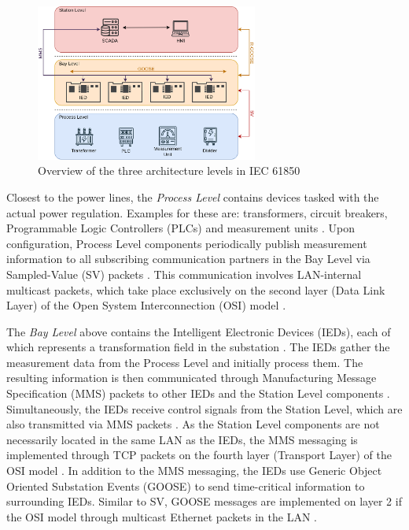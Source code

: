 \documentclass[conference, onecolumn, a4paper]{IEEEtran}
\begin{document}
\begin{figure}[h]
    \centering
    \includegraphics[width=0.65\textwidth]{images/IEC61850_Architecture.png}
    \caption{Overview of the three architecture levels in IEC 61850 \cite{SGRWin_IEC61850Architecture:2021}}
    \label{image:IEC61850Architecture}
\end{figure}

\noindent Closest to the power lines, the \textit{Process Level} contains devices tasked with the actual power regulation. Examples for these are: 
transformers, circuit breakers, Programmable Logic Controllers (PLCs) and measurement units \cite{SGRWin_IEC61850Architecture:2021}. Upon configuration, 
Process Level components periodically publish measurement information to all subscribing communication partners in the Bay Level via Sampled-Value (SV) 
packets \cite{TyphoonHIL_IEC61850SV:2021}. This communication involves LAN-internal multicast packets, which take place exclusively on the second layer 
(Data Link Layer) of the Open System Interconnection (OSI) model \cite{TyphoonHIL_IEC61850SV:2021}. 

\smallskip
The \textit{Bay Level} above contains the Intelligent Electronic Devices (IEDs), each of which represents a transformation field in the substation 
\cite[p. 29]{IEC61850-7-1:2011}. The IEDs gather the measurement data from the Process Level and initially process them. The resulting information 
is then communicated through Manufacturing Message Specification (MMS) packets to other IEDs and the Station Level components \cite[p. 44]{IEC61850-8-1:2011}. 
Simultaneously, the IEDs receive control signals from the Station Level, which are also transmitted via MMS packets \cite{trafficGen_IEC61850:2011}. 
As the Station Level components are not necessarily located in the same LAN as the IEDs, the MMS messaging is implemented through TCP packets on the 
fourth layer (Transport Layer) of the OSI model \cite[p. 45]{IEC61850-8-1:2011}. In addition to the MMS messaging, the IEDs use Generic Object 
Oriented Substation Events (GOOSE) to send time-critical information to surrounding IEDs. Similar to SV, GOOSE messages are implemented on layer 2 if 
the OSI model through multicast Ethernet packets in the LAN \cite{GOOSE_confidentiality_integrity:2020}.
\end{document}
